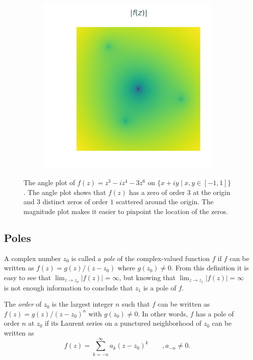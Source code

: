 \begin{figure}[H]
\begin{subfigure}{.49\textwidth}
    \includegraphics[width=\textwidth]{figures/zeros_magnitude.png}
\end{subfigure}
\caption{The angle plot of $f(z)=z^3 - iz^4 - 3z^6$ on $\{x+iy \mid x,y \in [-1,1]\}$. The angle plot shows that $f(z)$ has a zero of order $3$ at the origin and $3$ distinct zeros of order $1$ scattered around the origin.
The magnitude plot makes it easier to pinpoint the location of the zeros.}
\label{fig:complex-zeros}
\end{figure}

\subsection*{Poles} %

A complex number $z_0$ is called a \emph{pole} of the complex-valued function $f$ if $f$ can be written as $f(z) = g(z) / (z - z_0)$ where $g(z_0) \ne 0$.
From this definition it is easy to see that $\lim_{z\rightarrow z_0}|f(z)| = \infty$, but knowing that $\lim_{z\rightarrow z_1}|f(z)| = \infty$ is not enough information to conclude that $z_1$ is a pole of $f$.

The \emph{order} of $z_0$ is the largest integer $n$ such that $f$ can be written as $f(z) = g(z) / (z - z_0)^n$ with $g(z_0) \ne 0$.
In other words, $f$ has a pole of order $n$ at $z_0$ if its Laurent series on a punctured neighborhood of $z_0$ can be written as
\[
f(z) = \sum_{k=-n}^\infty a_k(z-z_0)^k  \qquad, a_{-n} \neq 0.
\]

